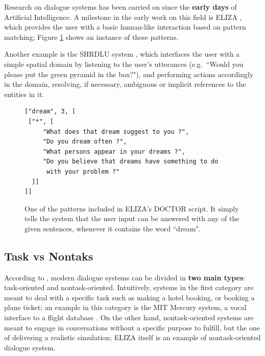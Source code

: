 Research on dialogue systems has been carried on since the \textbf{early days} of Artificial Intelligence. A milestone in the early work on this field is ELIZA \citep{Weizenbaum:1966:ECP:365153.365168}, which provides the user with a basic human-like interaction based on pattern matching; Figure \ref{ch:rw:ds:ELIZA} shows an instance of these patterns.

Another example is the SHRDLU system \citep{winograd1971procedure}, which interfaces the user with a simple spatial domain by listening to the user's utterances (e.g.\ ``Would you please put the green pyramid in the box?"), and performing actions accordingly in the domain, resolving, if necessary, ambiguous or implicit references to the entities in it.

\begin{figure}
\begin{Verbatim}[frame=single]
["dream", 3, [
 ["*", [
     "What does that dream suggest to you ?",
     "Do you dream often ?",
     "What persons appear in your dreams ?",
     "Do you believe that dreams have something to do
      with your problem ?"
  ]]
]]
\end{Verbatim}
\caption{One of the patterns included in ELIZA's DOCTOR script. It simply tells the system that the user input can be answered with any of the given sentences, whenever it contains the word ``dream".}
\label{ch:rw:ds:ELIZA}
\end{figure}

\subsection{Task vs Nontaks}

According to \cite{Jokinen2009}, modern dialogue systems can be divided in \textbf{two main types}: task-oriented and nontask-oriented. Intuitively, systems in the first category are meant to deal with a specific task such as making a hotel booking, or booking a plane ticket; an example in this category is the MIT Mercury system, a vocal interface to a flight database \citep{Seneff:2000:DMM:1605285.1605288}. On the other hand, nontask-oriented systems are meant to engage in conversations without a specific purpose to fulfill, but the one of delivering a realistic simulation; ELIZA itself is an example of nontask-oriented dialogue system.

